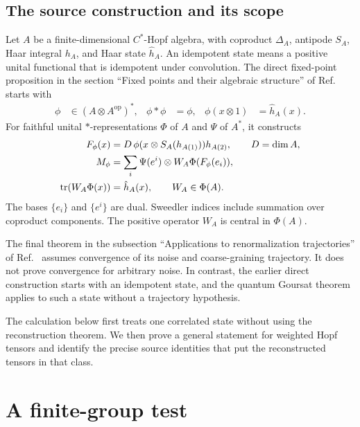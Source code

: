 \documentclass[aps,pra,reprint,nofootinbib,onecolumn]{revtex4-2}
\begin{document}
\subsection{The source construction and its scope}

Let $A$ be a finite-dimensional $C^*$-Hopf algebra, with coproduct
$\Delta_A$, antipode $S_A$, Haar integral $h_A$, and Haar state
$\hat h_A$. An idempotent state means a positive unital functional
that is idempotent under convolution. The direct fixed-point
proposition in the section ``Fixed points and their algebraic
structure'' of Ref.~\cite{Goursat} starts with
\begin{align}
	\phi            & \in(A\otimes A^{\mathrm{op}})^*,
	                &
	\phi*\phi       & =\phi,
	                &
	\phi(x\otimes1) & =\hat h_A(x).
	\label{eq:marginal}
\end{align}
For faithful unital $*$-representations $\Phi$ of $A$ and $\Psi$ of
$A^*$, it constructs
\begin{align}
	F_\phi(x)
	                & =D\,\phi(x\otimes S_A(h_{A(1)}))h_{A(2)},
	\qquad D=\dim A,
	\\
	M_\phi
	                & =\sum_i\Psi(e^i)\otimes W_A\Phi(F_\phi(e_i)),
	\label{eq:source-tensor}                                        \\
	\operatorname{tr}(W_A\Phi(x)) & =\hat h_A(x),
	\qquad W_A\in\Phi(A).
\end{align}
The bases $\{e_i\}$ and $\{e^i\}$ are dual. Sweedler indices include
summation over coproduct components. The positive operator $W_A$ is
central in $\Phi(A)$.

The final theorem in the subsection ``Applications to renormalization
trajectories'' of Ref.~\cite{Goursat} assumes convergence of its noise
and coarse-graining trajectory. It does not prove convergence for
arbitrary noise. In contrast, the earlier direct construction starts
with an idempotent state, and the quantum Goursat theorem applies to
such a state without a trajectory hypothesis.

The calculation below first treats one correlated state without using
the reconstruction theorem. We then prove a general statement for
weighted Hopf tensors and identify the precise source identities that
put the reconstructed tensors in that class.

\section{A finite-group test}
\end{document}
